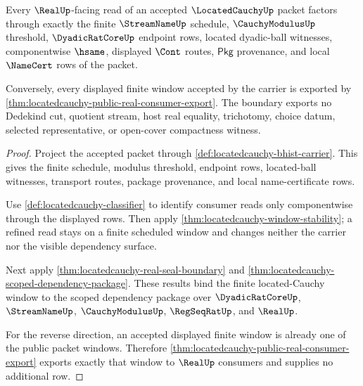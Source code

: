 \begin{theorem}
\label{thm:locatedcauchy-finite-window-bridge-boundary}
Every $\RealUp$-facing read of an accepted $\LocatedCauchyUp$ packet factors through exactly the finite $\StreamNameUp$ schedule, $\CauchyModulusUp$ threshold, $\DyadicRatCoreUp$ endpoint rows, located dyadic-ball witnesses, componentwise $\hsame$, displayed $\Cont$ routes, $\mathsf{Pkg}$ provenance, and local $\NameCert$ rows of the packet.

Conversely, every displayed finite window accepted by the carrier is exported by \autoref{thm:locatedcauchy-public-real-consumer-export}. The boundary exports no Dedekind cut, quotient stream, host real equality, trichotomy, choice datum, selected representative, or open-cover compactness witness.
\end{theorem}
\begin{proof}
Project the accepted packet through
\autoref{def:locatedcauchy-bhist-carrier}. This gives the finite schedule,
modulus threshold, endpoint rows, located-ball witnesses, transport routes,
package provenance, and local name-certificate rows.

Use \autoref{def:locatedcauchy-classifier} to identify consumer reads only
componentwise through the displayed rows. Then apply
\autoref{thm:locatedcauchy-window-stability}; a refined read stays on a finite
scheduled window and changes neither the carrier nor the visible dependency
surface.

Next apply \autoref{thm:locatedcauchy-real-seal-boundary} and
\autoref{thm:locatedcauchy-scoped-dependency-package}. These results bind the
finite located-Cauchy window to the scoped dependency package over
$\DyadicRatCoreUp$, $\StreamNameUp$, $\CauchyModulusUp$, $\RegSeqRatUp$, and
$\RealUp$.

For the reverse direction, an accepted displayed finite window is already one
of the public packet windows. Therefore
\autoref{thm:locatedcauchy-public-real-consumer-export} exports exactly that
window to $\RealUp$ consumers and supplies no additional row.
\end{proof}

